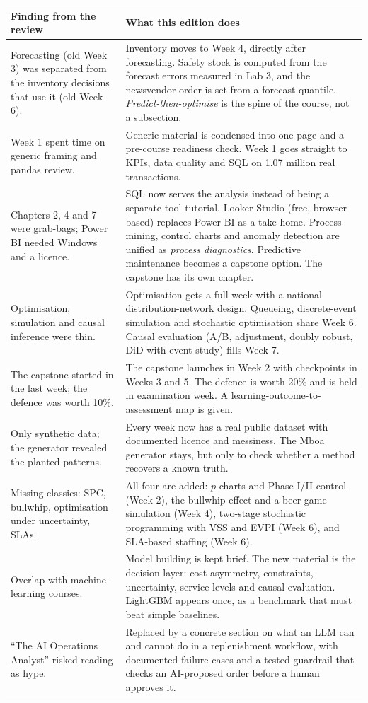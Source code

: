 \begin{center}\small
\begin{tabularx}{\linewidth}{@{}L{4.6cm}Y@{}}
\toprule
\textbf{Finding from the review} & \textbf{What this edition does}\\\midrule
Forecasting (old Week 3) was separated from the inventory decisions that use it (old Week 6). &
Inventory moves to Week 4, directly after forecasting. Safety stock is computed from the forecast errors measured
in Lab 3, and the newsvendor order is set from a forecast quantile. \emph{Predict-then-optimise} is the spine of
the course, not a subsection.\\
Week 1 spent time on generic framing and pandas review. &
Generic material is condensed into one page and a pre-course readiness check. Week 1 goes straight to KPIs,
data quality and SQL on 1.07 million real transactions.\\
Chapters 2, 4 and 7 were grab-bags; Power BI needed Windows and a licence. &
SQL now serves the analysis instead of being a separate tool tutorial. Looker Studio (free, browser-based)
replaces Power BI as a take-home. Process mining, control charts and anomaly detection are unified as
\emph{process diagnostics}. Predictive maintenance becomes a capstone option. The capstone has its own chapter.\\
Optimisation, simulation and causal inference were thin. &
Optimisation gets a full week with a national distribution-network design. Queueing, discrete-event simulation
and stochastic optimisation share Week 6. Causal evaluation (A/B, adjustment, doubly robust, DiD with event study)
fills Week 7.\\
The capstone started in the last week; the defence was worth 10\%. &
The capstone launches in Week 2 with checkpoints in Weeks 3 and 5. The defence is worth 20\% and is held in
examination week. A learning-outcome-to-assessment map is given.\\
Only synthetic data; the generator revealed the planted patterns. &
Every week now has a real public dataset with documented licence and messiness. The Mboa generator stays, but
only to check whether a method recovers a known truth.\\
Missing classics: SPC, bullwhip, optimisation under uncertainty, SLAs. &
All four are added: $p$-charts and Phase I/II control (Week 2), the bullwhip effect and a beer-game simulation
(Week 4), two-stage stochastic programming with VSS and EVPI (Week 6), and SLA-based staffing (Week 6).\\
Overlap with machine-learning courses. &
Model building is kept brief. The new material is the decision layer: cost asymmetry, constraints, uncertainty,
service levels and causal evaluation. LightGBM appears once, as a benchmark that must beat simple baselines.\\
``The AI Operations Analyst'' risked reading as hype. &
Replaced by a concrete section on what an LLM can and cannot do in a replenishment workflow, with documented
failure cases and a tested guardrail that checks an AI-proposed order before a human approves it.\\
\bottomrule
\end{tabularx}
\end{center}

